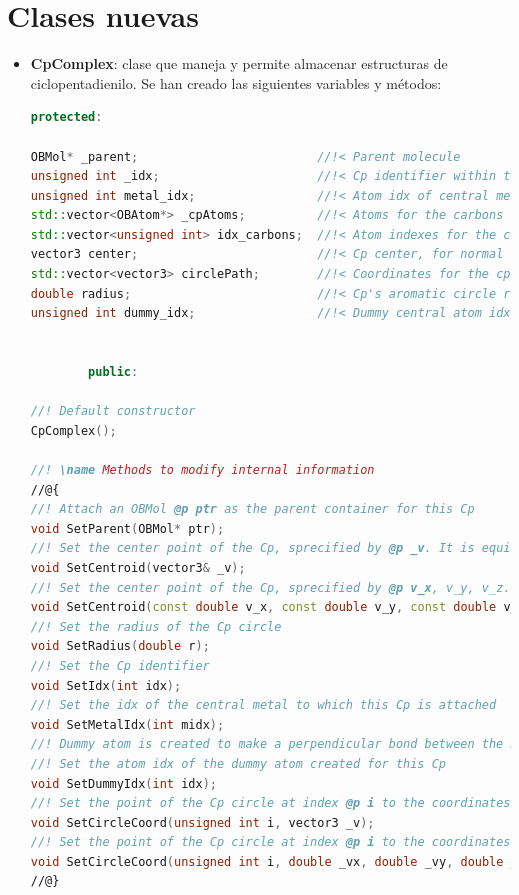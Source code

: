 \section{Clases nuevas}
\begin{itemize}
    \item \textbf{CpComplex}: clase que maneja y permite almacenar estructuras de ciclopentadienilo. Se han creado las siguientes variables y métodos:
    \begin{lstlisting}[language=C++]
	protected:
  
OBMol* _parent;                         //!< Parent molecule
unsigned int _idx;                      //!< Cp identifier within the molecule
unsigned int metal_idx;                 //!< Atom idx of central metal
std::vector<OBAtom*> _cpAtoms;          //!< Atoms for the carbons of the Cp structure
std::vector<unsigned int> idx_carbons;  //!< Atom indexes for the carbons of the Cp structure
vector3 center;                         //!< Cp center, for normal bond connection with metal atom, and aromatic circle position
std::vector<vector3> circlePath;        //!< Coordinates for the cp circle (needed to achieve a perspective circunference)
double radius;                          //!< Cp's aromatic circle radius
unsigned int dummy_idx;                 //!< Dummy central atom idx


        public:

//! Default constructor 
CpComplex();

//! \name Methods to modify internal information
//@{
//! Attach an OBMol @p ptr as the parent container for this Cp
void SetParent(OBMol* ptr);
//! Set the center point of the Cp, sprecified by @p _v. It is equidistant to every carbon in th Cp, as they are disposed in a regular polygon
void SetCentroid(vector3& _v);
//! Set the center point of the Cp, sprecified by @p v_x, v_y, v_z. It is equidistant to every carbon in th Cp, as they are disposed in a regular polygon
void SetCentroid(const double v_x, const double v_y, const double v_z);
//! Set the radius of the Cp circle
void SetRadius(double r);
//! Set the Cp identifier
void SetIdx(int idx);
//! Set the idx of the central metal to which this Cp is attached
void SetMetalIdx(int midx);
//! Dummy atom is created to make a perpendicular bond between the metal and the Cp drawing
//! Set the atom idx of the dummy atom created for this Cp 
void SetDummyIdx(int idx);
//! Set the point of the Cp circle at index @p i to the coordinates specified by @p _v
void SetCircleCoord(unsigned int i, vector3 _v);
//! Set the point of the Cp circle at index @p i to the coordinates specified by @p _vx, _vy, _vz
void SetCircleCoord(unsigned int i, double _vx, double _vy, double _vz = 0.0);
//@}



\end{lstlisting}
\end{itemize}
